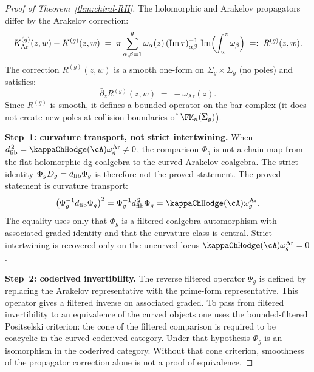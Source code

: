 \begin{proof}[Proof of Theorem~\textup{\ref{thm:chiral-RH}}]
The holomorphic and Arakelov propagators differ by the Arakelov
correction:
\begin{equation}\label{eq:propagator-difference}
 K^{(g)}_{\mathrm{Ar}}(z,w) - K^{(g)}(z,w)
 \;=\;
 \pi \sum_{\alpha,\beta=1}^g
 \omega_\alpha(z)\,
 (\operatorname{Im}\tau)^{-1}_{\alpha\beta}\,
 \operatorname{Im}\Bigl(\int_w^z \omega_\beta\Bigr)
 \;=:\;
 R^{(g)}(z,w).
\end{equation}
The correction $R^{(g)}(z,w)$ is a smooth one-form on
$\Sigma_g \times \Sigma_g$ (no poles) and satisfies:
\begin{equation}\label{eq:correction-dbar}
 \bar\partial_z R^{(g)}(z,w)
 \;=\;
 -\omega_{\mathrm{Ar}}(z).
\end{equation}
Since $R^{(g)}$ is smooth, it defines a bounded operator on the bar
complex (it does not create new poles at collision boundaries of
$\FM_n(\Sigma_g)$).

\smallskip\noindent
\textbf{Step~1: curvature transport, not strict intertwining.}
When $\dfib^{\,2}=\kappaChHodge(\cA)\omega_g^{\mathrm{Ar}}\ne0$, the comparison
$\Phi_g$ is not a chain map from the flat holomorphic dg coalgebra
to the curved Arakelov coalgebra. The strict identity
$\Phi_gD_{g}=d_{\mathrm{fib}}\Phi_g$ is therefore not the proved statement.
The proved statement is curvature transport:
\[
 \bigl(\Phi_g^{-1}\dfib\Phi_g\bigr)^2
 =
 \Phi_g^{-1}\dfib^{\,2}\Phi_g
 =
 \kappaChHodge(\cA)\omega_g^{\mathrm{Ar}} .
\]
The equality uses only that $\Phi_g$ is a filtered coalgebra
automorphism with associated graded identity and that the curvature
class is central. Strict intertwining is recovered only on the
uncurved locus $\kappaChHodge(\cA)\omega_g^{\mathrm{Ar}}=0$.

\smallskip\noindent
\textbf{Step~2: coderived invertibility.}
The reverse filtered operator $\Psi_g$ is defined by replacing the
Arakelov representative with the prime-form representative. This
operator gives a filtered inverse on associated graded. To pass from
filtered invertibility to an equivalence of the curved objects one
uses the bounded-filtered Positselski criterion: the cone of the
filtered comparison is required to be coacyclic in the curved
coderived category. Under that hypothesis $\Phi_g$ is an isomorphism
in the coderived category. Without that cone criterion, smoothness of
the propagator correction alone is not a proof of equivalence.


\end{proof}

